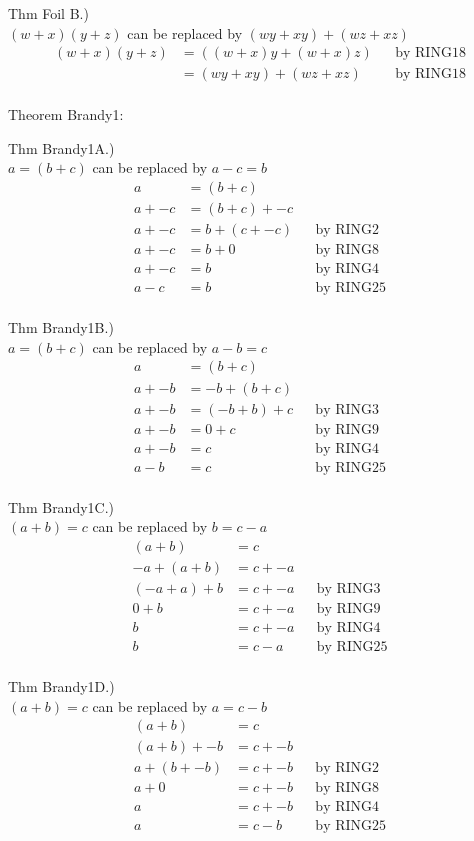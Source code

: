 \documentclass[a4paper,12pt]{article}
\begin{document}
Thm Foil B.)\\
$(w + x) (y + z)$ can be replaced by $(wy + xy) + (wz + xz)$
\begin{align*}
(w + x) (y + z)
&=((w + x)y + (w + x)z) && \text{by RING18} \\
&=(wy + xy) + (wz + xz) && \text{by RING18} \\
\end{align*}


Theorem Brandy1:

Thm Brandy1A.)\\
$a = (b + c)$ can be replaced by $a - c = b$
\begin{align*}
a &= (b + c) \\
a + -c &= (b + c) + -c \\
a + -c &= b + (c + -c) && \text{by RING2} \\
a + -c &= b + 0 && \text{by RING8} \\
a + -c &= b && \text{by RING4} \\
a - c &= b && \text{by RING25} \\
\end{align*}

Thm Brandy1B.)\\
$a = (b + c)$ can be replaced by $a - b = c$
\begin{align*}
a &= (b + c) \\
a + -b &= -b + (b + c) \\
a + -b &= (-b + b) + c && \text{by RING3} \\
a + -b &= 0 + c && \text{by RING9} \\
a + -b &= c && \text{by RING4} \\
a - b &= c && \text{by RING25} \\
\end{align*}

Thm Brandy1C.)\\
$(a + b) = c$ can be replaced by $b = c - a$
\begin{align*}
(a + b) &= c \\
-a + (a + b) &= c + -a \\
(-a + a) + b &= c + -a && \text{by RING3} \\
0 + b &= c + -a && \text{by RING9} \\
b &= c + -a && \text{by RING4} \\
b &= c - a && \text{by RING25} \\
\end{align*}

Thm Brandy1D.)\\
$(a + b) = c$ can be replaced by $a = c - b$
\begin{align*}
(a + b) &= c \\
(a + b) + -b &= c + -b \\
a + (b + -b) &= c + -b && \text{by RING2} \\
a + 0 &= c + -b && \text{by RING8} \\
a &= c + -b && \text{by RING4} \\
a &= c - b && \text{by RING25} \\
\end{align*}
\end{document}
